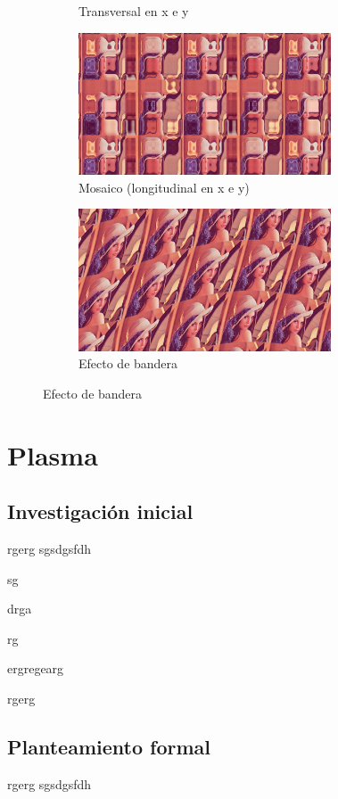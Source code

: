 \begin{figure}[h]
\begin{subfigure}[b]{0.48\textwidth}
		\caption{Transversal en x e y}
	\end{subfigure}
	\begin{subfigure}[b]{0.48\textwidth}
		\centering
		\includegraphics[width=7.5cm]{archivos/deformation5}
		\caption{Mosaico (longitudinal en x e y)}
	\end{subfigure}
	\begin{subfigure}[b]{0.48\textwidth}
		\centering
		\includegraphics[width=7.5cm]{archivos/deformation6}
		\caption{Efecto de bandera}
	\end{subfigure}
	\label{fig:alldeformations}
\end{figure}

\section{Plasma}

\subsection{Investigación inicial}

rgerg
sgsdgsfdh

sg

drga

rg

ergregearg

rgerg

\subsection{Planteamiento formal}

rgerg
sgsdgsfdh

